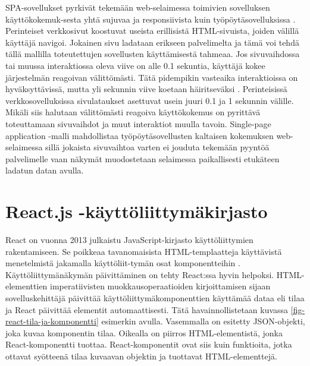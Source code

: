\documentclass[finnish,twoside,censored,csm,sw-track-2018]{HYthesisML}
\begin{document}
SPA-sovellukset pyrkivät tekemään web-selaimessa toimivien sovelluksen käyttökokemuk-sesta yhtä sujuvaa ja responsiivista kuin työpöytäsovelluksissa \citep{spa-jadhav}. Perinteiset verkkosivut koostuvat useista erillisistä HTML-sivuista, joiden välillä käyttäjä navigoi. Jokainen sivu ladataan erikseen palvelimelta ja tämä voi tehdä tällä mallilla toteutettujen sovellusten käyttämisestä tahmeaa. Jos sivuvaihdossa tai muussa interaktiossa oleva viive on alle 0.1 sekuntia, käyttäjä kokee järjestelmän reagoivan välittömästi. Tätä pidempikin vasteaika interaktioissa on hyväksyttävissä, mutta yli sekunnin viive koetaan häiritseväksi \citep{Nielsen}. Perinteisissä verkkosovelluksissa sivulataukset asettuvat usein juuri 0.1 ja 1 sekunnin välille. Mikäli siis halutaan välittömästi reagoiva käyttökokemus on pyrittävä toteuttamaan sivuvaihdot ja muut interaktiot muulla tavoin. Single-page application -malli mahdollistaa työpöytäsovellusten kaltaisen kokemuksen web-selaimessa sillä jokaista sivuvaihtoa varten ei jouduta tekemään pyyntöä palvelimelle vaan näkymät muodostetaan selaimessa paikallisesti etukäteen ladatun datan avulla.

\section{React.js -käyttöliittymäkirjasto}
\label{sec-React.js}

React on vuonna 2013 julkaistu \citep{react-release} JavaScript-kirjasto käyttöliittymien rakentamiseen. Se poikkeaa tavanomaisista HTML-templaatteja käyttävistä menetelmistä jakamalla käyttöliit-tymän osat komponentteihin \citep{react-why}. Käyttöliittymänäkymän päivittäminen on tehty React:ssa hyvin helpoksi. HTML-elementtien imperatiivisten muokkausoperaatioiden kirjoittamisen sijaan sovelluskehittäjä päivittää käyttöliittymäkomponenttien käyttämää dataa eli tilaa ja React päivittää elementit automaattisesti. Tätä havainnollistetaan kuvassa \ref{fig-react-tila-ja-komponentti} esimerkin avulla. Vasemmalla on esitetty JSON-objekti, joka kuvaa komponentin tilaa. Oikealla on piirros HTML-elementistä, jonka React-komponentti tuottaa. React-komponentit ovat siis kuin funktioita, jotka ottavat syötteenä tilaa kuvaavan objektin ja tuottavat HTML-elementtejä.
\end{document}

